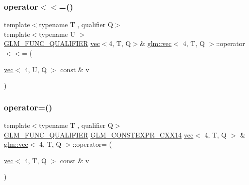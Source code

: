 \subsubsection{\texorpdfstring{operator$<$$<$=()}{operator<<=()}\hspace{0.1cm}{\footnotesize\ttfamily [6/6]}}
{\footnotesize\ttfamily template$<$typename T , qualifier Q$>$ \\
template$<$typename U $>$ \\
\mbox{\hyperlink{setup_8hpp_a33fdea6f91c5f834105f7415e2a64407}{G\+L\+M\+\_\+\+F\+U\+N\+C\+\_\+\+Q\+U\+A\+L\+I\+F\+I\+ER}} \mbox{\hyperlink{structglm_1_1vec}{vec}}$<$4, T, Q$>$\& \mbox{\hyperlink{structglm_1_1vec}{glm\+::vec}}$<$ 4, T, Q $>$\+::operator$<$$<$= (\begin{DoxyParamCaption}\item[{\mbox{\hyperlink{structglm_1_1vec}{vec}}$<$ 4, U, Q $>$ const \&}]{v }\end{DoxyParamCaption})}

\mbox{\label{structglm_1_1vec_3_014_00_01_t_00_01_q_01_4_aecb1fc48895abb231dc7bd64a941ec51}} 
\subsubsection{\texorpdfstring{operator=()}{operator=()}\hspace{0.1cm}{\footnotesize\ttfamily [1/3]}}
{\footnotesize\ttfamily template$<$typename T , qualifier Q$>$ \\
\mbox{\hyperlink{setup_8hpp_a33fdea6f91c5f834105f7415e2a64407}{G\+L\+M\+\_\+\+F\+U\+N\+C\+\_\+\+Q\+U\+A\+L\+I\+F\+I\+ER}} \mbox{\hyperlink{setup_8hpp_a4dd12abf5e1164bc57f3a34671d03844}{G\+L\+M\+\_\+\+C\+O\+N\+S\+T\+E\+X\+P\+R\+\_\+\+C\+X\+X14}} \mbox{\hyperlink{structglm_1_1vec}{vec}}$<$ 4, T, Q $>$ \& \mbox{\hyperlink{structglm_1_1vec}{glm\+::vec}}$<$ 4, T, Q $>$\+::operator= (\begin{DoxyParamCaption}\item[{\mbox{\hyperlink{structglm_1_1vec}{vec}}$<$ 4, T, Q $>$ const \&}]{v }\end{DoxyParamCaption})}

\mbox{\label{structglm_1_1vec_3_014_00_01_t_00_01_q_01_4_a48ac928cee66a63093353f54d915e223}} 
